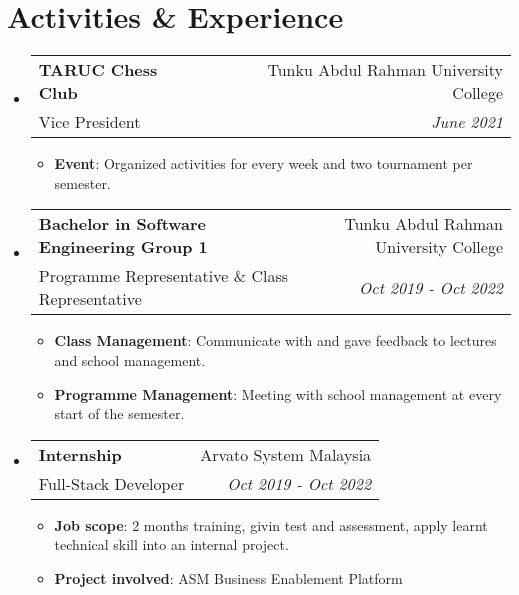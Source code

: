 \documentclass[a4paper, 12pt]{article}
\makeatletter
\newcommand{\resumeItem}[2]{
  \item\small{
    \textbf{\textsf{#1}}{: \textsf{#2} \vspace{-2pt}}
  }
}
\newcommand{\resumeSubheading}[4]{
  \vspace{-1pt}\item
    \begin{tabular*}{0.97\textwidth}[t]{l@{\extracolsep{\fill}}r}
      \textbf{\textsf{#1}} & \textsf{#2} \\
      \textsf{\small{#3}} & \textit{\textsf{\small{#4}}} \\
    \end{tabular*}\vspace{-5pt}
}
\newcommand{\resumeSubHeadingListStart}{\begin{itemize}[leftmargin=*]}
\newcommand{\resumeSubHeadingListEnd}{\end{itemize}}
\newcommand{\resumeItemListStart}{\begin{itemize}}
\newcommand{\resumeItemListEnd}{\end{itemize}\vspace{-5pt}}
\makeatother
\begin{document}
\section{Activities \& Experience}
    \resumeSubHeadingListStart
        \resumeSubheading
        {TARUC Chess Club}{Tunku Abdul Rahman University College}
        {Vice President}{June 2021}
            \resumeItemListStart
                \resumeItem{Event}
                {Organized activities for every week and two tournament per semester.}
            \resumeItemListEnd
    
    \vspace{5px}
    \resumeSubheading
        {Bachelor in Software Engineering Group 1}{Tunku Abdul Rahman University College}
        {Programme Representative \& Class Representative}{Oct 2019 - Oct 2022}
            \resumeItemListStart
                \resumeItem{Class Management}
                {Communicate with and gave feedback to lectures and school management.}
                \resumeItem{Programme Management}
                {Meeting with school management at every start of the semester.}
            \resumeItemListEnd
            
    \vspace{5px}
    \resumeSubheading
        {Internship}{Arvato System Malaysia}
        {Full-Stack Developer}{Oct 2019 - Oct 2022}
            \resumeItemListStart
                \resumeItem{Job scope}
                {2 months training, givin test and assessment, apply learnt technical skill into an internal project.}
                \resumeItem{Project involved} 
                {ASM Business Enablement Platform}
            \resumeItemListEnd
\resumeSubHeadingListEnd
\end{document}
